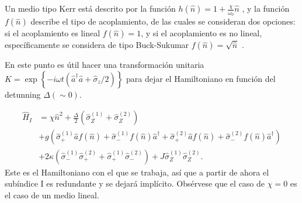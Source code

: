 Un medio tipo Kerr está descrito por la funci\'on $h(\hat n)=1+\frac{\chi}{\omega_0}\hat n$ \cite{Lugiato1987}, y la funci\'on $f(\hat n)$ describe el tipo de acoplamiento, de las cuales se consideran dos opciones: si el acoplamiento es lineal $f(\hat n)=1$, y si el acoplamiento es no lineal, específicamente se considera de tipo Buck-Sukumar $f(\hat n) = \sqrt{\hat n}$ \cite{Buck1980}.

En este punto es útil hacer una transformaci\'on unitaria  $K = \exp\left\{-i \omega t (\hat a^\dagger \hat a + \hat \sigma_z/2)\right\}$ para dejar el Hamiltoniano en funci\'on del detunning $\Delta (\sim 0)$. 

\begin{equation}
\begin{split}
     \hat H_I & = \chi \hat n^2+\frac{ \Delta}{2}(\hat\sigma_Z^{(1)}+\hat\sigma_Z^{(2)})   \\ 
     & +  g(\hat\sigma_+^{(1)}\hat a f(\hat n)+\hat\sigma_-^{(1)}f(\hat n) \hat a^\dagger + \hat\sigma_+^{(2)}\hat a f(\hat n)+\hat\sigma_-^{(2)}f(\hat n) \hat a^\dagger) \\ 
 & + 2 \kappa (\hat \sigma_-^{(1)}\hat \sigma_+^{(2)}+\hat \sigma_+^{(1)}\hat \sigma_-^{(2)}) +  J \hat \sigma_Z^{(1)}\hat \sigma_Z^{(2)}.
\end{split}
\end{equation}\label{ec4:H}
Este es el Hamiltoniano con el que se trabaja, así que a partir de ahora el subíndice I es redundante y se dejará implícito. Obsérvese que el caso de $\chi=0$ es el caso de un medio lineal. 


